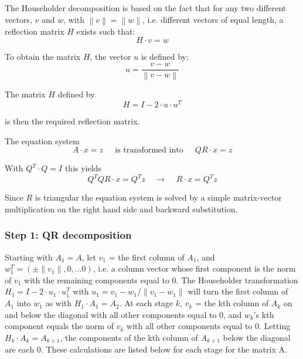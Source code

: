 The Householder decomposition is based on the fact that for any two
different vectors, $v$ and $w$, with $\left\lVert v\right\rVert =
\left\lVert w\right\rVert$, i.e. different vectors of equal length, a
reflection matrix $H$ exists such that:
\begin{equation}
H \cdot v = w
\end{equation}

To obtain the matrix $H$, the vector $u$ is defined by:
\begin{equation}
u = \dfrac{v - w}{\left\lVert v - w\right\rVert}
\end{equation}

The matrix $H$ defined by 
\begin{equation}
\label{eq:ReflectionMatrix}
H = I - 2 \cdot u \cdot u^T
\end{equation}

is then the required reflection matrix.

\addvspace{12pt}

The equation system
\begin{equation}
A\cdot x = z
\;\;\;\; \textrm{ is transformed into } \;\;\;\;
Q R\cdot x = z
\end{equation}

With $Q^T\cdot Q = I$ this yields
\begin{equation}
Q^T Q R\cdot x = Q^T z
\;\;\;\; \rightarrow \;\;\;\;
R\cdot x = Q^T z
\end{equation}

Since $R$ is triangular the equation system is solved by a simple
matrix-vector multiplication on the right hand side and backward
substitution.

\subsubsection{Step 1: QR decomposition}

Starting with $A_1 = A$, let $v_1$ = the first column of $A_1$, and
$w_1^T = \left(\pm\lVert v_1\rVert , 0 , \ldots 0\right)$, i.e. a column
vector whose first component is the norm of $v_1$ with the remaining
components equal to 0.  The Householder transformation $H_1 = I - 2
\cdot u_1 \cdot u_1^T$ with $u_1 = v_1 - w_1 / \lVert v_1 - w_1
\rVert$ will turn the first column of $A_1$ into $w_1$ as with $H_1
\cdot A_1 = A_2$.  At each stage $k$, $v_k$ = the kth column of $A_k$
on and below the diagonal with all other components equal to 0, and
$w_k$'s kth component equals the norm of $v_k$ with all other
components equal to 0.  Letting $H_k \cdot A_k = A_{k+1}$, the
components of the kth column of $A_{k+1}$ below the diagonal are each
0.  These calculations are listed below for each stage for the matrix
A.

